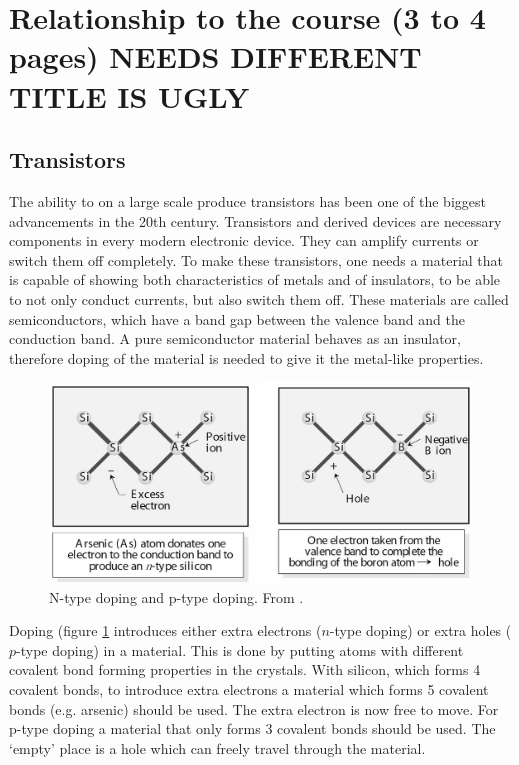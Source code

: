 \section{Relationship to the course (3 to 4 pages) NEEDS DIFFERENT TITLE IS UGLY}
% 
% 
% 
\subsection{Transistors}

The ability to on a large scale produce transistors has been one of the biggest advancements in the 20th century. Transistors and derived devices are necessary components in every modern electronic device. They can amplify currents or switch them off completely. To make these transistors, one needs a material that is capable of showing both characteristics of metals and of insulators, to be able to not only conduct currents, but also switch them off. These materials are called semiconductors, which have a band gap between the valence band and the conduction band. A pure semiconductor material behaves as an insulator, therefore doping of the material is needed to give it the metal-like properties.

\begin{figure}[!ht]
 \begin{center}
  \includegraphics[width=1\textwidth]{doping}
  \caption{N-type doping and p-type doping. From \citet{vanweesbook}.}
  \label{fig:doping}
 \end{center}
\end{figure}

Doping (figure \ref{fig:doping} introduces either extra electrons ($n$-type doping) or extra holes ($p$-type doping) in a material. This is done by putting atoms with different covalent bond forming properties in the crystals. With silicon, which forms 4 covalent bonds, to introduce extra electrons a material which forms 5 covalent bonds (e.g. arsenic) should be used. The extra electron is now free to move. For p-type doping a material that only forms 3 covalent bonds should be used. The `empty' place is a hole which can freely travel through the material.

